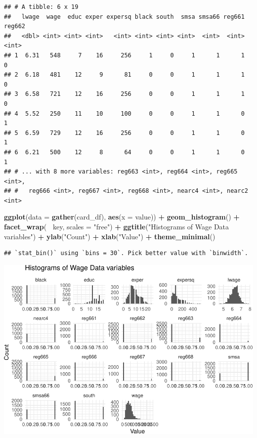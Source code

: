 \documentclass[11pt,]{article}
\newenvironment{Shaded}{\begin{snugshade}}{\end{snugshade}}
\newcommand{\KeywordTok}[1]{\textcolor[rgb]{0.13,0.29,0.53}{\textbf{#1}}}
\newcommand{\DataTypeTok}[1]{\textcolor[rgb]{0.13,0.29,0.53}{#1}}
\newcommand{\StringTok}[1]{\textcolor[rgb]{0.31,0.60,0.02}{#1}}
\newcommand{\OperatorTok}[1]{\textcolor[rgb]{0.81,0.36,0.00}{\textbf{#1}}}
\newcommand{\NormalTok}[1]{#1}
\begin{document}
\begin{verbatim}
## # A tibble: 6 x 19
##   lwage  wage  educ exper expersq black south  smsa smsa66 reg661 reg662
##   <dbl> <int> <int> <int>   <int> <int> <int> <int>  <int>  <int>  <int>
## 1  6.31   548     7    16     256     1     0     1      1      1      0
## 2  6.18   481    12     9      81     0     0     1      1      1      0
## 3  6.58   721    12    16     256     0     0     1      1      1      0
## 4  5.52   250    11    10     100     0     0     1      1      0      1
## 5  6.59   729    12    16     256     0     0     1      1      0      1
## 6  6.21   500    12     8      64     0     0     1      1      0      1
## # ... with 8 more variables: reg663 <int>, reg664 <int>, reg665 <int>,
## #   reg666 <int>, reg667 <int>, reg668 <int>, nearc4 <int>, nearc2 <int>
\end{verbatim}

\begin{Shaded}
\begin{Highlighting}[]
\KeywordTok{ggplot}\NormalTok{(}\DataTypeTok{data =} \KeywordTok{gather}\NormalTok{(card_df), }\KeywordTok{aes}\NormalTok{(}\DataTypeTok{x =}\NormalTok{ value)) }\OperatorTok{+}
\StringTok{  }\KeywordTok{geom_histogram}\NormalTok{() }\OperatorTok{+}
\StringTok{  }\KeywordTok{facet_wrap}\NormalTok{(}\OperatorTok{~}\StringTok{ }\NormalTok{key, }\DataTypeTok{scales =} \StringTok{"free"}\NormalTok{) }\OperatorTok{+}
\StringTok{  }\KeywordTok{ggtitle}\NormalTok{(}\StringTok{"Histograms of Wage Data variables"}\NormalTok{) }\OperatorTok{+}
\StringTok{  }\KeywordTok{ylab}\NormalTok{(}\StringTok{"Count"}\NormalTok{) }\OperatorTok{+}
\StringTok{  }\KeywordTok{xlab}\NormalTok{(}\StringTok{"Value"}\NormalTok{) }\OperatorTok{+}\StringTok{ }\KeywordTok{theme_minimal}\NormalTok{()}
\end{Highlighting}
\end{Shaded}

\begin{verbatim}
## `stat_bin()` using `bins = 30`. Pick better value with `binwidth`.
\end{verbatim}

\includegraphics{ps5_code_files/figure-latex/plot_series-1.pdf}
\end{document}

